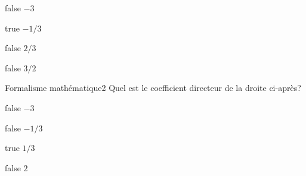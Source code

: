         \begin{reponses}
            \item[false] $-3$
		    \item[true] $-1/3$
		    \item[false] $2/3$
		    \item[false] $3/2$
		    \end{reponses}
        \begin{question}{27}{Formalisme mathématique}{2}{}
           Quel est le coefficient directeur de la droite ci-après?
            \begin{figure}
             \end{figure}
        \end{question}
        \begin{reponses}
            \item[false] $-3$
		    \item[false] $-1/3$
		    \item[true] $1/3$
		    \item[false] $2$
		    \end{reponses}

